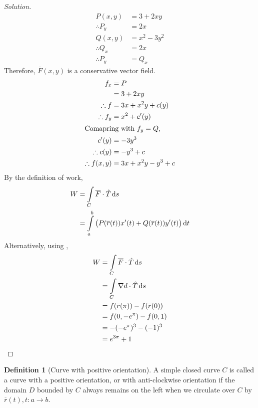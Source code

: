 \documentclass[fleqn, a4paper, 12pt]{article}
\theoremstyle{definition}
\newtheorem{definition}{Definition}
\theoremstyle{theorem}
\theoremstyle{remark}
\newenvironment{solution}
{\begin{proof}[Solution]\let\qed\relax}
	{\end{proof}}
\begin{document}
\begin{solution}
	\begin{align*}
		P(x,y) &= 3 + 2xy\\
		\therefore P_y &= 2x\\
		Q(x,y) &= x^2 - 3 y^2\\
		\therefore Q_x &= 2x\\
		\therefore P_y &= Q_x
	\end{align*}
	Therefore, $\overline{F}(x,y)$ is a conservative vector field.
	\begin{align*}
		f_x &= P\\
		&= 3 + 2 x y\\
		\therefore f &= 3x + x^2 y + c(y)\\
		\therefore f_y &= x^2 + c'(y)\\
		\intertext{Comapring with $f_y = Q$,}
		c'(y) &= -3 y^3\\
		\therefore c(y) &= - y^3 + c\\
		\therefore f(x,y) &= 3x + x^2 y - y^3 + c
	\end{align*}
	By the definition of work,
	\begin{align*}
		W &= \int\limits_{C} \overline{F} \cdot \hat{T} \dif s\\
		&= \int\limits_{a}^{b} \left( P(\overline{r}(t)) x'(t) + Q(\overline{r}(t)) y'(t) \right) \dif t
	\end{align*}
	Alternatively, using ,
	\begin{align*}
		W &= \int\limits_{C} \overline{F} \cdot \hat{T} \dif s\\
		&= \int\limits_{C} \nabla d \cdot \hat{T} \dif s\\
		&= f(\overline{r}(\pi)) - f(\overline{r}(0))\\
		&= f(0, -e^{\pi}) - f(0, 1)\\
		&= -(-e^{\pi})^3 - (-1)^3\\
		&= e^{3 \pi} + 1
	\end{align*}
\end{solution}

\begin{definition}[Curve with positive orientation]
	A simple closed curve $C$ is called a curve with a positive orientation, or with anti-clockwise orientation if the domain $D$ bounded by $C$ always remains on the left when we circulate over $C$ by $\overline{r}(t), t : a \to b$.
\end{definition}
\end{document}
